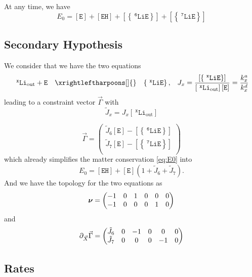 \documentclass[aps,onecolumn,12pt]{revtex4}
\newcommand{\mychem}[1]{\mathtt{#1}}
\newcommand{\myconc}[1]{\left\lbrack{#1}\right\rbrack}
\newcommand{\spLi}[1]{{~^{\mychem{#1}}\mychem{Li}}}
\newcommand{\spEout}{\mychem{E}}
\newcommand{\Eout}{\myconc{\spEout}}
\newcommand{\spLiE}[1]{\left\lbrace\spLi{#1}\spEout\right\rbrace}
\newcommand{\LiE}[1]{\myconc{\spLiE{#1}}}
\newcommand{\spLiOut}[1]{{\spLi{#1}}_{\mathrm{out}}}
\newcommand{\LiOut}[1]{\myconc{\spLiOut{#1}}}
\newcommand{\spEHin}{\mychem{EH}}
\newcommand{\EHin}{\myconc{\spEHin}}
\newcommand{\mymat}[1]{{\bm{#1}}}
\begin{document}
At any time, we  have
\begin{equation} 
	\label{eq:E0}
	E_0 = \Eout + \EHin +  \LiE{6} + \LiE{7}
\end{equation}

\subsection{Secondary Hypothesis}
We consider that we have the two equations
\begin{equation}
	\begin{array}{rcll}
	 \spLiOut{x} +  \spEout &  \xrightleftharpoons[]{} & \spLiE{x}, & J_x = \dfrac{\LiE{x}}{\LiOut{x} \Eout} = \dfrac{k_x^a}{k_x^d}\\
	 \end{array}
\end{equation}
leading to a constraint vector $\vec{\Gamma}$
with 
\begin{equation}
	\tilde{J}_x = J_x \LiOut{x}
\end{equation}

\begin{equation}
\vec{\Gamma} = 
\begin{pmatrix}
	\tilde{J}_6 \Eout - \LiE{6} \\
	\tilde{J}_7 \Eout - \LiE{7} \\
\end{pmatrix}
\end{equation}
which already simplifies the matter conservation \eqref{eq:E0} into
\begin{equation}
	E_0 = \EHin + \Eout \left(1+\tilde{J}_6+\tilde{J}_7\right).
\end{equation}
And we have the topology for the two equations as
\begin{equation}
	\label{eq:Nu}
	\mymat{\nu}=\begin{pmatrix}-1 & 0 & 1 & 0 & 0 & 0\cr -1 & 0 & 0 & 0 & 1 & 0\end{pmatrix}
\end{equation}
and
\begin{equation}
	\partial_{\vec{X}}\vec{\Gamma} = 
	\begin{pmatrix}\tilde{J}_6 & 0 & -1 & 0 & 0 & 0\cr\tilde{J}_7 & 0 & 0 & 0 & -1 & 0\end{pmatrix}
\end{equation}

\subsection{Rates}
\end{document}
